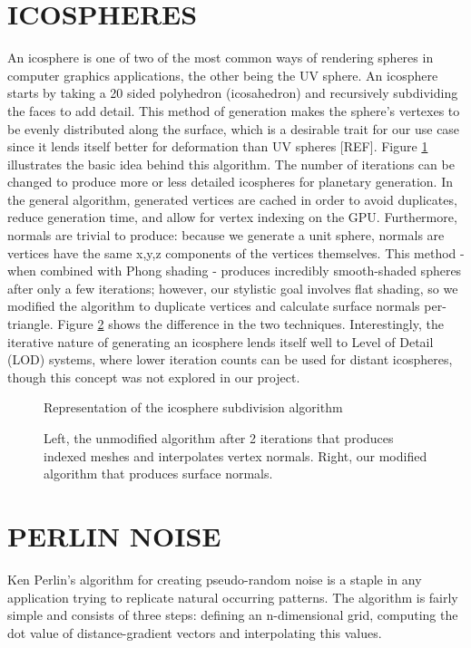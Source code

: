 \documentclass[a4paper,twoside]{article}
\begin{document}
\section{\uppercase{IcoSpheres}}
\label{sec:icosphere}
\noindent An icosphere is one of two of the most common ways of rendering spheres in computer graphics applications, the other being the UV sphere. An icosphere starts by taking a 20 sided polyhedron (icosahedron)  and recursively subdividing the faces to add detail. This method of generation makes the sphere's vertexes to be evenly distributed along the surface, which is a desirable trait for our use case since it lends itself better for deformation than UV spheres [REF]. Figure \ref{fig_isa} illustrates the basic idea behind this algorithm. The number of iterations can be changed to produce more or less detailed icospheres for planetary generation. In the general algorithm, generated vertices are cached in order to avoid duplicates, reduce generation time, and allow for vertex indexing on the GPU. Furthermore, normals are trivial to produce: because we generate a unit sphere, normals are vertices have the same x,y,z components of the vertices themselves. This method - when combined with Phong shading - produces incredibly smooth-shaded spheres after only a few iterations; however, our stylistic goal involves flat shading, so we modified the algorithm to duplicate vertices and calculate surface normals per-triangle. Figure \ref{fig_isn} shows the difference in the two techniques. Interestingly, the iterative nature of generating an icosphere lends itself well to Level of Detail (LOD) systems, where lower iteration counts can be used for distant icospheres, though this concept was not explored in our project.

\begin{figure}
\caption{Representation of the icosphere subdivision algorithm}
\label{fig_isa}
\end{figure}

\begin{figure}
\caption{Left, the unmodified algorithm after 2 iterations that produces indexed meshes and interpolates vertex normals. Right, our modified algorithm that produces surface normals.}
\label{fig_isn}
\end{figure}

\section{\uppercase{Perlin Noise}}
\label{sec:pnoise}
\noindent Ken Perlin's algorithm for creating pseudo-random noise is a staple in any application trying to replicate natural occurring patterns. The algorithm is fairly simple and consists of three steps: defining an n-dimensional grid, computing the dot value of distance-gradient vectors and interpolating this values.
\end{document}
